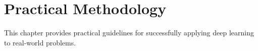 
\chapter{Practical Methodology}
\label{chap:practical-methodology}

This chapter provides practical guidelines for successfully applying deep learning to real-world problems.







